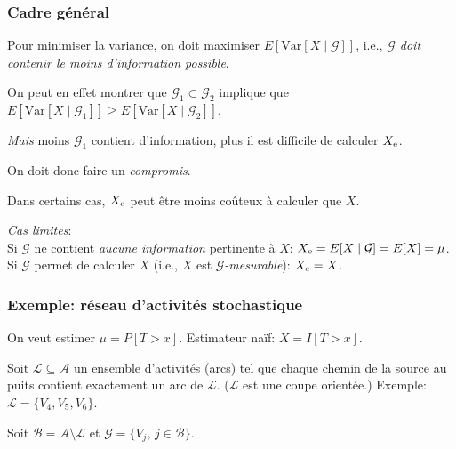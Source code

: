 \documentclass[t,usepdftitle=false]{beamer}
\def\cA{\mathcal{A}}
\def\cB{\mathcal{B}}
\def\cG{\mathcal{G}}
\def\cL{\mathcal{L}}
\def\Var{\mbox{Var}}
\def\yel{}
\def\rme{{\rm e}}
\begin{document}

\begin{frame}
	\frametitle{Cadre g\'en\'eral}
	
	Pour minimiser la variance, on doit maximiser $E[\Var[X\mid \cG]]$,
	i.e., \emph{$\cG$ doit contenir le moins d'information possible}.
	
	On peut en effet montrer que $\cG_1\subset\cG_2$ implique que 
	$E[\Var[X\mid \cG_1]] \ge E[\Var[X\mid \cG_2]]$.
	
	\emph{Mais} moins $\cG_1$ contient d'information, plus il est difficile
	de calculer $X_\rme$.
	
	On doit donc faire un \emph{compromis}.
	
	Dans certains cas, $X_\rme$ peut \^etre moins co\^uteux \`a calculer que $X$.
	
	\emph{Cas limites}:\\
	Si $\cG$ ne contient \emph{aucune information} pertinente \`a $X$:
	$\yel{X_\rme} = E[X\mid\cG] = E[X] = \mu$.\\
	Si $\cG$ permet de calculer $X$ (i.e., $X$ est \emph{$\cG$-mesurable}): 
	$\yel{X_{\rme}} = X$.
	
\end{frame}

\begin{frame}[fragile]
	\frametitle{Exemple: r\'eseau d'activit\'es stochastique}
	
	On veut estimer $\mu = P[T > x]$.	
	Estimateur na\"{i}f: $\yel{X} = I[T > x]$.
	
	
	Soit $\yel{\cL}\subseteq\cA$ un ensemble d'activit\'es (arcs) tel que
	chaque chemin de la source au puits contient exactement un arc de $\cL$.
	($\cL$ est une coupe orient\'ee.) Exemple: $\cL = \{ V_4, V_5, V_6 \}$.

\begin{small}
	\begin{center}
		
	\end{center}
\end{small}	
	Soit $\yel{\cB} = \cA\setminus\cL$ et $\yel{\cG} = \{V_j,\, j \in\cB\}$.

\end{frame}

\end{document}
